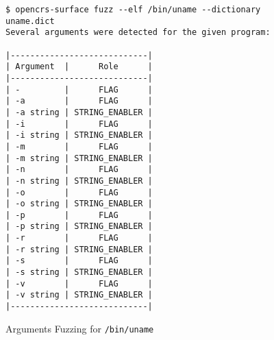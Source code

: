 \begin{frame}[fragile]
    \begin{figure}[!ht]
        \centering
        \tiny
        \begin{minipage}{0.7\textwidth}
            \begin{verbatim}
$ opencrs-surface fuzz --elf /bin/uname --dictionary uname.dict
Several arguments were detected for the given program:

|----------------------------|
| Argument  |      Role      |
|----------------------------|
| -         |      FLAG      |
| -a        |      FLAG      |
| -a string | STRING_ENABLER |
| -i        |      FLAG      |
| -i string | STRING_ENABLER |
| -m        |      FLAG      |
| -m string | STRING_ENABLER |
| -n        |      FLAG      |
| -n string | STRING_ENABLER |
| -o        |      FLAG      |
| -o string | STRING_ENABLER |
| -p        |      FLAG      |
| -p string | STRING_ENABLER |
| -r        |      FLAG      |
| -r string | STRING_ENABLER |
| -s        |      FLAG      |
| -s string | STRING_ENABLER |
| -v        |      FLAG      |
| -v string | STRING_ENABLER |
|----------------------------|
    \end{verbatim}
        \end{minipage}
        \caption{Arguments Fuzzing for \texttt{/bin/uname}}
    \end{figure}
\end{frame}

